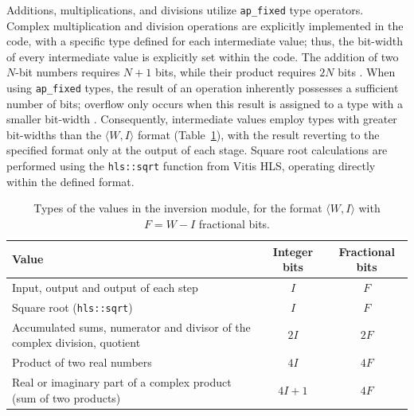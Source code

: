 Additions, multiplications, and divisions utilize \texttt{ap\_fixed} type operators. Complex multiplication and division operations are explicitly implemented in the code, with a specific type defined for each intermediate value; thus, the bit-width of every intermediate value is explicitly set within the code. The addition of two $N$-bit numbers requires $N+1$ bits, while their product requires $2N$ bits \cite[pp.~72--73]{kastner-hls}. When using \texttt{ap\_fixed} types, the result of an operation inherently possesses a sufficient number of bits; overflow only occurs when this result is assigned to a type with a smaller bit-width \cite[p.~74]{kastner-hls}. Consequently, intermediate values employ types with greater bit-widths than the $\langle W, I\rangle$ format (Table~\ref{tab:tipos-intermediarios}), with the result reverting to the specified format only at the output of each stage. Square root calculations are performed using the \texttt{hls::sqrt} function from Vitis HLS, operating directly within the defined format.

\begin{table}[!ht]
\caption{Types of the values in the inversion module, for the format $\langle W, I\rangle$ with $F = W - I$ fractional bits.}
\label{tab:tipos-intermediarios}
\vspace{4pt} %
\centering
\footnotesize
\renewcommand{\arraystretch}{1.2}
\begin{tabular}{p{7.4cm}cc}
\toprule
\textbf{Value} & \textbf{Integer bits} & \textbf{Fractional bits} \\
\midrule
Input, output and output of each step & $I$ & $F$ \\
Square root (\texttt{hls::sqrt}) & $I$ & $F$ \\
Accumulated sums, numerator and divisor of the complex division, quotient & $2I$ & $2F$ \\
Product of two real numbers & $4I$ & $4F$ \\
Real or imaginary part of a complex product (sum of two products) & $4I + 1$ & $4F$ \\
\bottomrule
\end{tabular}
\vspace{4pt}
\end{table}


